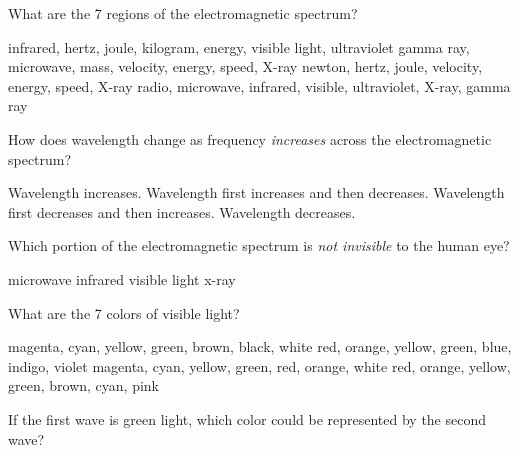 \documentclass{exam}
\begin{document}
\begin{questions}

\question
What are the 7 regions of the electromagnetic spectrum?


\begin{choices}
\choice infrared, hertz, joule, kilogram, energy, visible light, ultraviolet
\choice gamma ray, microwave, mass, velocity, energy, speed, X-ray
\choice newton, hertz, joule, velocity, energy, speed, X-ray
\correctchoice radio, microwave, infrared, visible, ultraviolet, X-ray, gamma ray
\end{choices}

\question
How does wavelength change as frequency \textit{increases} across the electromagnetic spectrum?


\begin{choices}
\choice Wavelength increases.
\choice Wavelength first increases and then decreases.
\choice Wavelength first decreases and then increases.
\CorrectChoice Wavelength decreases.
\end{choices}

\question
Which portion of the electromagnetic spectrum is \textit{not invisible} to the human eye?

\begin{choices}
\choice microwave
\choice infrared
\CorrectChoice visible light
\choice x-ray
\end{choices}

\question
What are the 7 colors of visible light?

\begin{choices}
\choice magenta, cyan, yellow, green, brown, black, white
\correctchoice red, orange, yellow, green, blue, indigo, violet
\choice magenta, cyan, yellow, green, red, orange, white
\choice red, orange, yellow, green, brown, cyan, pink
\end{choices}

\question
If the first wave is green light, which color could be represented by the second wave?

\begin{center}
    \centering
\end{center}


\end{questions}
\end{document}
